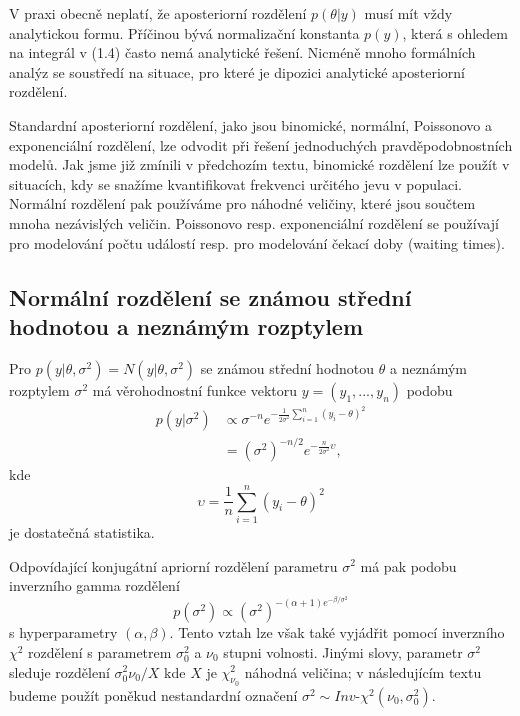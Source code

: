 V praxi obecně neplatí, že aposteriorní rozdělení $p(\theta | y)$ musí mít vždy analytickou formu. Příčinou bývá normalizační konstanta $p(y)$, která s ohledem na integrál v (1.4) často nemá analytické řešení. Nicméně mnoho formálních analýz se soustředí na situace, pro které je dipozici analytické aposteriorní rozdělení.

Standardní aposteriorní rozdělení, jako jsou binomické, normální, Poissonovo a exponenciální rozdělení, lze odvodit při řešení jednoduchých pravděpodobnostních modelů. Jak jsme již zmínili v předchozím textu, binomické rozdělení lze použít v situacích, kdy se snažíme kvantifikovat frekvenci určitého jevu v populaci. Normální rozdělení pak používáme pro náhodné veličiny, které jsou součtem mnoha nezávislých veličin. Poissonovo resp. exponenciální rozdělení se používají pro modelování počtu událostí resp. pro modelování čekací doby (waiting times).

\subsection{Normální rozdělení se známou střední hodnotou a neznámým rozptylem}

Pro $p(y | \theta, \sigma^2) = N(y | \theta, \sigma^2)$ se známou střední hodnotou $\theta$ a neznámým rozptylem $\sigma^2$ má věrohodnostní funkce vektoru $y = (y_1, ..., y_n)$ podobu
\begin{equation}
\begin{split}
p(y | \sigma^2) & \varpropto \sigma^{-n} e^{-\frac{1}{2 \sigma^2} \sum_{i = 1}^n (y_i - \theta)^2}\\
 & = (\sigma^2)^{-n/2} e^{-\frac{n}{2 \sigma^2}\upsilon},
\end{split}
\end{equation}
kde
\begin{equation}
\upsilon = \frac{1}{n}\sum_{i = 1}^n (y_i - \theta)^2
\end{equation}
je dostatečná statistika.

Odpovídající konjugátní apriorní rozdělení parametru $\sigma^2$ má pak podobu inverzního gamma rozdělení
\begin{equation}
p(\sigma^2) \varpropto (\sigma^2)^{-(\alpha + 1) e^{-\beta / \sigma^2}}
\end{equation}
s hyperparametry $(\alpha, \beta)$. Tento vztah lze však také vyjádřit pomocí inverzního $\chi^2$ rozdělení s parametrem $\sigma_0^2$ a $\nu_0$ stupni volnosti. Jinými slovy, parametr $\sigma^2$ sleduje rozdělení $\sigma_0^2 \nu_0 / X$ kde $X$ je $\chi^2_{\nu_0}$ náhodná veličina; v následujícím textu budeme použít poněkud nestandardní označení $\sigma^2 \sim \textit{Inv-}\chi^2(\nu_0, \sigma_0^2)$.

